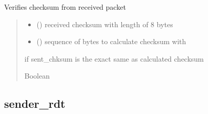 \documentclass[letterpaper,10pt,oneside,english,openany]{sphinxmanual}
\begin{document}
\begin{fulllineitems}
\label{\detokenize{modules:receiver_rdt.verify_integrity}}
\pysigstartsignatures
\pysiglinewithargsret
{}
{\sphinxparamcomma {}}
{}
\pysigstopsignatures
\sphinxAtStartPar
Verifies checksum from received packet
\begin{quote}\begin{description}
\begin{itemize}
\item {} 
\sphinxAtStartPar
{} () \textendash{} received checksum with length of 8 bytes

\item {} 
\sphinxAtStartPar
{} () \textendash{} sequence of bytes to calculate checksum with

\end{itemize}

\sphinxAtStartPar
if sent\_chksum is the exact same as calculated checksum

\sphinxAtStartPar
Boolean

\end{description}\end{quote}

\end{fulllineitems}



\subsection{sender\_rdt}
\label{\detokenize{modules:module-sender_rdt}}\label{\detokenize{modules:sender-rdt}}
\end{document}
